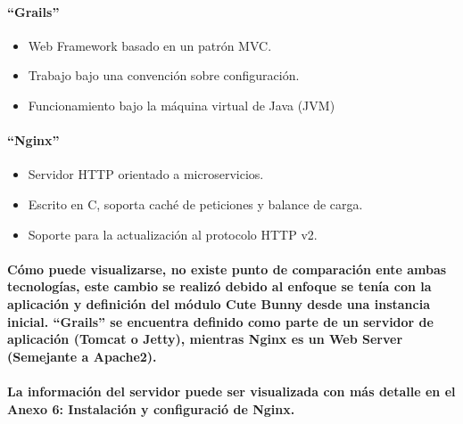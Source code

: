     \paragraph{``Grails''}    
    \begin{itemize}
      \item Web Framework basado en un patrón MVC.
      \item Trabajo bajo una convención sobre configuración.
      \item Funcionamiento bajo la máquina virtual de Java (JVM)
    \end{itemize}
    \paragraph{``Nginx''}    
    \begin{itemize}
      \item Servidor HTTP orientado a microservicios.
      \item Escrito en C, soporta caché de peticiones y balance de carga.
      \item Soporte para la actualización al protocolo HTTP v2.
    \end{itemize}
    \paragraph{Cómo puede visualizarse, no existe punto de comparación ente ambas tecnologías, este cambio se realizó debido al enfoque se tenía con la aplicación y definición del módulo Cute Bunny desde una instancia inicial. ``Grails'' se encuentra definido como parte de un servidor de aplicación (Tomcat o Jetty), mientras Nginx es un Web Server (Semejante a Apache2).}
    \paragraph{La información del servidor puede ser visualizada con más detalle en el Anexo 6: Instalación y configuració de Nginx.}  
